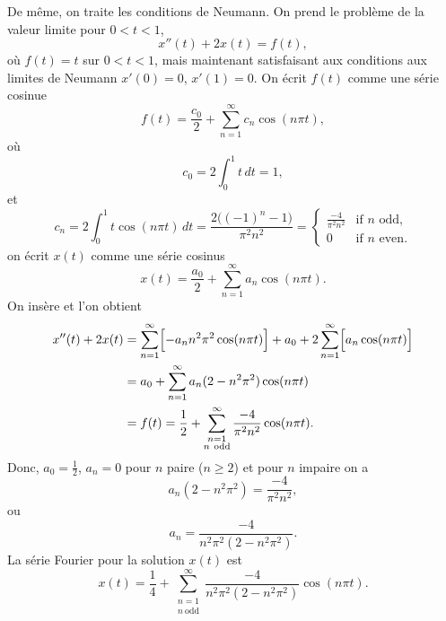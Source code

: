 \begin{example}
De même, on traite les conditions de Neumann.
On prend le problème de la valeur limite pour $0 < t < 1$,
\begin{equation*}
x''(t) + 2 x(t) = f(t) ,
\end{equation*}
où $f(t) = t$ sur $0 < t < 1$, mais maintenant satisfaisant
aux conditions aux limites de Neumann
$x'(0) = 0$, $x'(1)=0$.
On écrit $f(t)$ comme une série cosinue
\begin{equation*}
f(t) = \frac{c_0}{2} + \sum_{n=1}^\infty c_n \cos (n \pi t) ,
\end{equation*}
où
\begin{equation*}
c_0 = 2 \int_0^1 t \,dt = 1 ,
\end{equation*}
et
\begin{equation*}
c_n = 2 \int_0^1 t \cos (n \pi t) \,dt =
\frac{2\bigl({(-1)}^n-1\bigr)}{\pi^2 n^2} = 
\begin{cases}
\frac{-4}{\pi^2 n^2} & \text{if } n \text{ odd} , \\
0 & \text{if } n \text{ even}.
\end{cases}
\end{equation*}
on écrit $x(t)$ comme une série cosinus
\begin{equation*}
x(t) = \frac{a_0}{2} + \sum_{n=1}^\infty a_n \cos (n \pi t) .
\end{equation*}
On insère et l'on obtient
\begin{equation*}
\begin{split}
x''(t) + 2 x(t) & =
\sum_{n=1}^\infty \Bigl[ - a_n n^2 \pi^2 \cos (n \pi t) \Bigr]
+
a_0 +
2
\sum_{n=1}^\infty \Bigl[ a_n \cos (n \pi t) \Bigr]
\\
& =
a_0 +
\sum_{n=1}^\infty a_n (2 - n^2 \pi^2 ) \cos (n \pi t)
\\
& = f(t)
=
\frac{1}{2} +
\sum_{\substack{n=1\\n~\text{odd}}}^\infty
\frac{-4}{\pi^2 n^2} \cos (n \pi t) .
\end{split}
\end{equation*}
Donc, $a_0 = \frac{1}{2}$, $a_n = 0$ pour $n$ paire ($n \geq 2$) et pour
$n$ impaire on a
\begin{equation*}
a_n (2 - n^2 \pi^2)
=
\frac{-4}{\pi^2 n^2} ,
\end{equation*}
ou
\begin{equation*}
a_n
=
\frac{-4}{n^2 \pi^2 (2 - n^2 \pi^2)} .
\end{equation*}
La série Fourier pour la solution $x(t)$ est
\begin{equation*}
x(t) = 
\frac{1}{4} +
\sum_{\substack{n=1\\n~\text{odd}}}^\infty
\frac{-4}{n^2 \pi^2 (2 - n^2 \pi^2)} 
\cos (n \pi t) .
\end{equation*}
\end{example}

